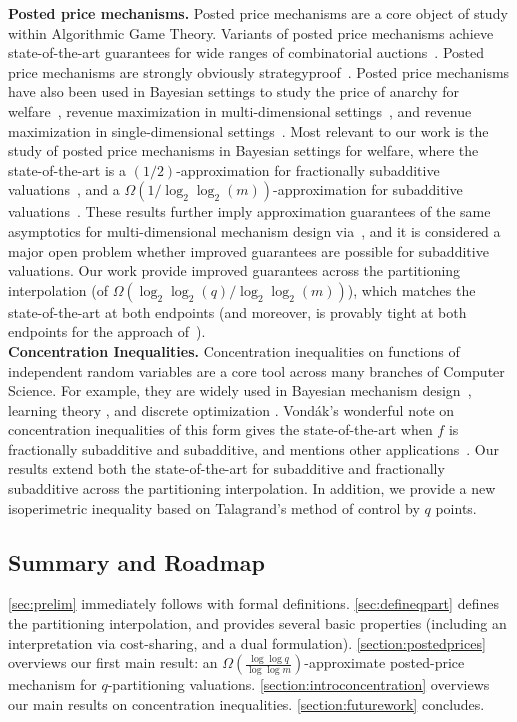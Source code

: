 \documentclass[11pt]{article}\usepackage{amsfonts}
\numberwithin{theorem}{subsection}
\begin{document}
\noindent\textbf{Posted price mechanisms.} Posted price mechanisms are a core object of study within Algorithmic Game Theory. Variants of posted price mechanisms achieve state-of-the-art guarantees for wide ranges of combinatorial auctions~\cite{AssadiKS21,DobzinskiNS12}. Posted price mechanisms are strongly obviously strategyproof~\cite{Li17,PyciaT19}. Posted price mechanisms have also been used in Bayesian settings to study the price of anarchy for welfare~\cite{FeldmanGL15,DuttingFKL20,DuttingKL20}, revenue maximization in multi-dimensional settings~\cite{ChawlaHMS10,KleinbergW19,ChawlaM16, CaiZ17}, and revenue maximization in single-dimensional settings~\cite{Yan11,AlaeiHNPY15,FengHL19, JinLQTX19,JinLTX19,JinJLZ21}. Most relevant to our work is the study of posted price mechanisms in Bayesian settings for welfare, where the state-of-the-art is a $(1/2)$-approximation for fractionally subadditive valuations~\cite{FeldmanGL15}, and a $\Omega(1/\log_2\log_2(m))$-approximation for subadditive valuations~\cite{DuttingKL20}. These results further imply approximation guarantees of the same asymptotics for multi-dimensional mechanism design via~\cite{CaiZ17}, and it is considered a major open problem whether improved guarantees are possible for subadditive valuations. Our work provide improved guarantees across the partitioning interpolation (of $\Omega(\log_2\log_2 (q)/\log_2\log_2(m))$), which matches the state-of-the-art at both endpoints (and moreover, is provably tight at both endpoints for the approach of~\cite{DuttingKL20}).\\ 

\noindent\textbf{Concentration Inequalities.} Concentration inequalities on functions of independent random variables are a core tool across many branches of Computer Science. For example, they are widely used in Bayesian mechanism design~\cite{RubinsteinW18,ChawlaM16, CaiZ17, KothariMSSW19}, learning theory
\cite{BalcanH11,FeldmanV13}, and discrete optimization \cite{FairsteinKS21}. Vond\'{a}k's wonderful note on concentration inequalities of this form gives the state-of-the-art when $f$ is fractionally subadditive and subadditive, and mentions other applications~\cite{Vondrak10}. Our results extend both the state-of-the-art for subadditive and fractionally subadditive across the partitioning interpolation. In addition, we provide a new isoperimetric inequality based on Talagrand's method of control by $q$ points.

\subsection{Summary and Roadmap}
\cref{sec:prelim} immediately follows with formal definitions. \cref{sec:defineqpart} defines the partitioning interpolation, and provides several basic properties (including an interpretation via cost-sharing, and a dual formulation). \cref{section:postedprices} overviews our first main result: an $\Omega(\frac{\log\log q}{\log \log m})$-approximate posted-price mechanism for $q$-partitioning valuations. \cref{section:introconcentration} overviews our main results on concentration inequalities. \cref{section:futurework} concludes.
\end{document}

